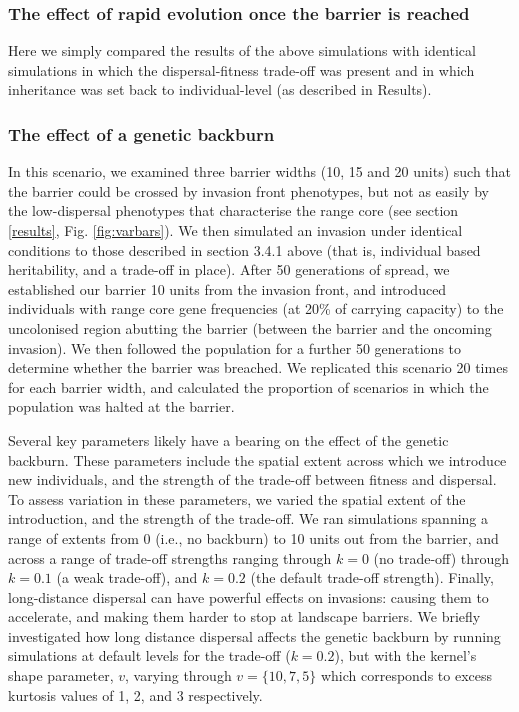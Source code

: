 \documentclass{article}
\begin{document}
\subsubsection{The effect of rapid evolution once the barrier is reached}

Here we simply compared the results of the above simulations with identical simulations in which the dispersal-fitness trade-off was present and in which inheritance was set back to individual-level (as described in Results).

\subsubsection{The effect of a genetic
backburn}

In this scenario, we examined three barrier widths (10, 15 and 20 units) such that the
barrier could be crossed by invasion front phenotypes, but not as easily by
the low-dispersal phenotypes that characterise the range core (see section
\ref{results}, Fig. \ref{fig:varbars}). We then simulated an invasion under identical conditions to those described in section 3.4.1
above (that is, individual based heritability, and a trade-off in place). After 50 generations of spread, we established our barrier 10 units from
the invasion front, and introduced individuals with range core gene
frequencies (at 20\% of carrying capacity) to the uncolonised region
abutting the barrier (between the barrier and the oncoming invasion). We
then followed the population for a further 50 generations to determine
whether the barrier was breached. We replicated this scenario 20 times for each barrier width,
and calculated the proportion of scenarios in which the population was halted at the barrier.

Several key parameters likely have a bearing on the effect of the genetic backburn.  These parameters include the spatial extent across which we introduce new individuals, and the strength of the trade-off between fitness and dispersal.  To assess variation in these parameters, we varied the spatial extent of the introduction, and the strength of the trade-off.  We ran simulations spanning a range of
extents from 0 (i.e., no backburn) to 10 units out from the barrier, and across a range of trade-off strengths ranging through $k=0$ (no trade-off) through $k=0.1$ (a weak trade-off), and $k=0.2$ (the default trade-off strength).  Finally, long-distance dispersal can have powerful effects on invasions: causing them to accelerate, and making them harder to stop at landscape barriers.  We briefly investigated how long distance dispersal affects the genetic backburn by running simulations at default levels for the trade-off ($k=0.2$), but with the kernel's shape parameter, $v$, varying through $v=\{10, 7, 5\}$ which corresponds to excess kurtosis values of 1, 2, and 3 respectively.
\end{document}
